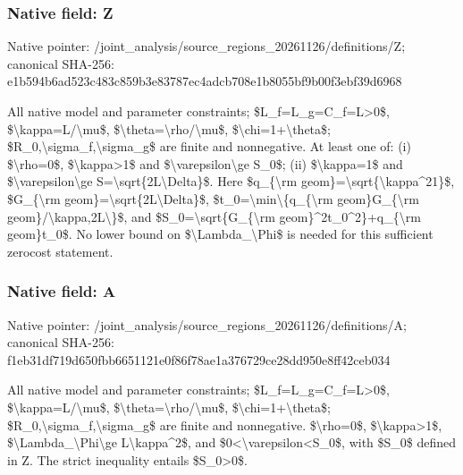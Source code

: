 \documentclass[10pt,a4paper]{article}
\begin{document}
\subsubsection{Native field: Z}


Native pointer: /joint\_analysis/source\_r\allowbreak{}egions\_20261126/definiti\allowbreak{}ons/Z; canonical SHA-256: e1b594b6ad523c483c859b3e\allowbreak{}83787ec4adcb708e1b8055bf\allowbreak{}9b00f3ebf39d6968


All native model and parameter constraints; \$L\_f=L\_g=C\_f=L>0\$, \$\textbackslash{}kappa=L/\textbackslash{}mu\$, \$\textbackslash{}theta=\textbackslash{}rho/\textbackslash{}mu\$, \$\textbackslash{}chi=1+\textbackslash{}theta\$; \$R\_0,\textbackslash{}sigma\_f,\textbackslash{}sigma\_g\$ are finite and nonnegative. At least one of: (i) \$\textbackslash{}rho=0\$, \$\textbackslash{}kappa>1\$ and \$\textbackslash{}varepsilon\textbackslash{}ge S\_0\$; (ii) \$\textbackslash{}kappa=1\$ and \$\textbackslash{}varepsilon\textbackslash{}ge S=\textbackslash{}sqrt\{2L\textbackslash{}Delta\}\$. Here \$q\_\{\textbackslash{}rm geom\}=\textbackslash{}sqrt\{\textbackslash{}kappa\textasciicircum{}21\}\$, \$G\_\{\textbackslash{}rm geom\}=\textbackslash{}sqrt\{2L\textbackslash{}Delta\}\$, \$t\_0=\textbackslash{}min\textbackslash{}\{q\_\{\textbackslash{}rm geom\}G\_\{\textbackslash{}rm geom\}/\textbackslash{}kappa,2L\textbackslash{}\}\$, and \$S\_0=\textbackslash{}sqrt\{G\_\{\textbackslash{}rm geom\}\textasciicircum{}2t\_0\textasciicircum{}2\}+q\_\{\textbackslash{}rm geom\}t\_0\$. No lower bound on \$\textbackslash{}Lambda\_\textbackslash{}Phi\$ is needed for this sufficient zerocost statement.


\subsubsection{Native field: A}


Native pointer: /joint\_analysis/source\_r\allowbreak{}egions\_20261126/definiti\allowbreak{}ons/A; canonical SHA-256: f1eb31df719d650fbb665112\allowbreak{}1e0f86f78ae1a376729ce28d\allowbreak{}d950e8ff42ceb034


All native model and parameter constraints; \$L\_f=L\_g=C\_f=L>0\$, \$\textbackslash{}kappa=L/\textbackslash{}mu\$, \$\textbackslash{}theta=\textbackslash{}rho/\textbackslash{}mu\$, \$\textbackslash{}chi=1+\textbackslash{}theta\$; \$R\_0,\textbackslash{}sigma\_f,\textbackslash{}sigma\_g\$ are finite and nonnegative. \$\textbackslash{}rho=0\$, \$\textbackslash{}kappa>1\$, \$\textbackslash{}Lambda\_\textbackslash{}Phi\textbackslash{}ge L\textbackslash{}kappa\textasciicircum{}2\$, and \$0<\textbackslash{}varepsilon<S\_0\$, with \$S\_0\$ defined in Z. The strict inequality entails \$S\_0>0\$.
\end{document}
